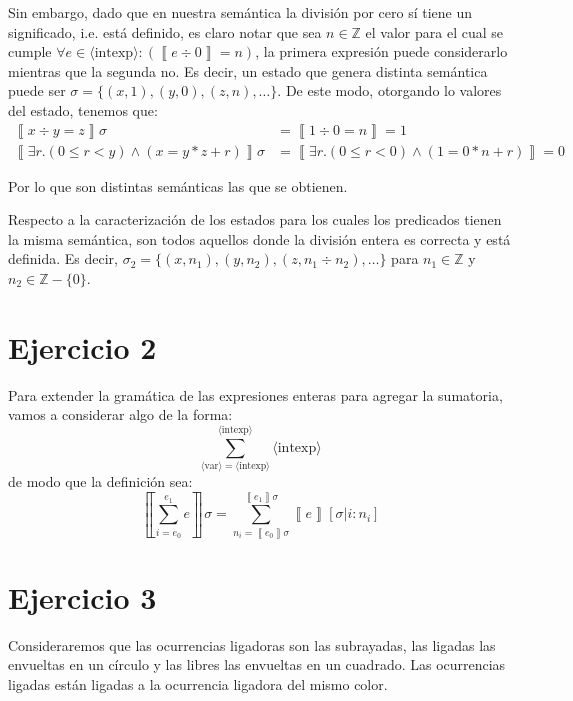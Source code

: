 \documentclass{article}
\newcommand{\aexp}[1]{\langle\text{#1}\rangle}
\newcommand{\intexp}{\aexp{intexp}}
\newcommand{\var}{\aexp{var}}
\newcommand{\sem}[1]{\left\llbracket #1\right\rrbracket}
\newcommand{\Z}{\mathbb{Z}}
\begin{document}
Sin embargo, dado que en nuestra semántica la división por cero sí tiene un significado, i.e. está definido, es claro notar que sea $n \in \Z$ el valor para el cual se cumple $\forall e \in \intexp : (\sem{e \div 0} = n)$, la primera expresión puede considerarlo mientras que la segunda no.
Es decir, un estado que genera distinta semántica puede ser $\sigma = \{(x, 1), (y, 0), (z, n), \dots\}$.
De este modo, otorgando lo valores del estado, tenemos que:
\begin{equation*}
	\begin{aligned}
		\sem{x \div y = z} \sigma                                    & = \sem{1 \div 0 = n} = 1                                    \\
		\sem{\exists r. (0 \leq r < y) \land (x = y * z + r)} \sigma & = \sem{\exists r. (0 \leq r < 0) \land (1 = 0 * n + r)} = 0
	\end{aligned}
\end{equation*}

Por lo que son distintas semánticas las que se obtienen.

Respecto a la caracterización de los estados para los cuales los predicados tienen la misma semántica, son todos aquellos donde la división entera es correcta y está definida.
Es decir, $\sigma_2 = \{(x, n_1), (y, n_2), (z, n_1 \div n_2), \dots\}$ para $n_1 \in \Z$ y $n_2 \in \Z - \{0\}$.

\section*{Ejercicio 2}
Para extender la gramática de las expresiones enteras para agregar la sumatoria, vamos a considerar algo de la forma:
\begin{equation*}
	\sum_{\var = \intexp}^{\intexp} \intexp
\end{equation*}
de modo que la definición sea:
\begin{equation*}
	\sem{\sum_{i = e_0}^{e_1} e} \sigma = \sum_{n_i = \sem{e_0} \sigma}^{\sem{e_1} \sigma} \sem{e} [\sigma | i : n_i]
\end{equation*}

\section*{Ejercicio 3}
Consideraremos que las ocurrencias ligadoras son las subrayadas, las ligadas las envueltas en un círculo y las libres las envueltas en un cuadrado.
Las ocurrencias ligadas están ligadas a la ocurrencia ligadora del mismo color.
\end{document}
